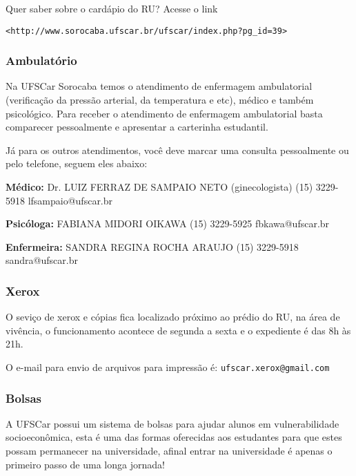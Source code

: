 Quer saber sobre o cardápio do RU? Acesse o link

\texttt{<http://www.sorocaba.ufscar.br/ufscar/index.php?pg\_id=39>}

\subsubsection{Ambulatório}
Na UFSCar Sorocaba temos o atendimento de enfermagem ambulatorial (verificação da pressão arterial, da temperatura e etc), médico e também psicológico. Para receber o atendimento de enfermagem ambulatorial basta comparecer pessoalmente e apresentar a carterinha estudantil.

Já para os outros atendimentos, você deve marcar uma consulta pessoalmente ou pelo telefone, seguem eles abaixo:

\noindent \textbf{Médico:}
\newline Dr. LUIZ FERRAZ DE SAMPAIO NETO (ginecologista)
\newline (15) 3229-5918
\newline lfsampaio@ufscar.br

\begin{multicols}{2}
\noindent \textbf{Psicóloga:}
  \newline FABIANA MIDORI OIKAWA
  \newline (15) 3229-5925
  \newline fbkawa@ufscar.br

\noindent \textbf{Enfermeira:}
  \newline SANDRA REGINA ROCHA ARAUJO
  \newline (15) 3229-5918
  \newline sandra@ufscar.br

\end{multicols}

\subsubsection{Xerox}
O seviço de xerox e cópias fica localizado próximo ao prédio do RU, na área de vivência, o funcionamento acontece de segunda a sexta e o expediente é das 8h às 21h. 

O e-mail para envio de arquivos para impressão é: \texttt{ufscar.xerox@gmail.com}

\subsubsection{Bolsas}
A UFSCar possui um sistema de bolsas para ajudar alunos em vulnerabilidade socioeconômica, esta é uma das formas oferecidas aos estudantes para que estes possam permanecer na universidade, afinal entrar na universidade é apenas o primeiro passo de uma longa jornada!

